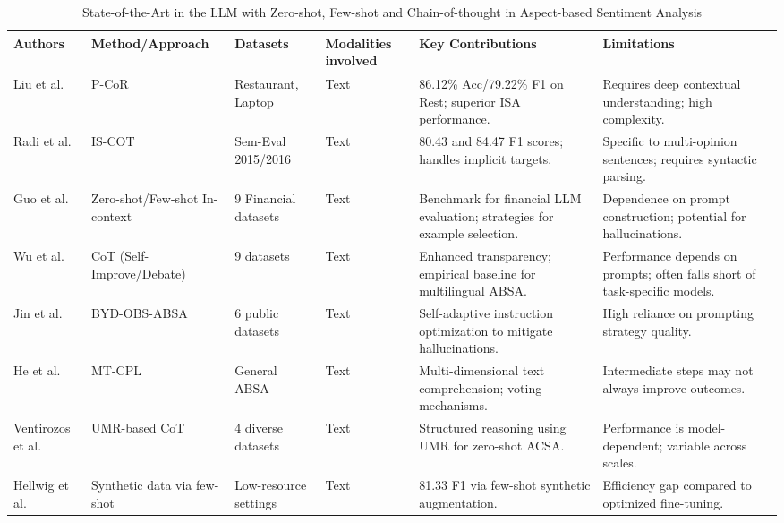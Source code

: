 \documentclass[english, online, cse, master]{dithesis}
\begin{document}
\begin{landscape}
\begin{table}[p]
\centering
\caption{State-of-the-Art in the LLM with Zero-shot, Few-shot and Chain-of-thought in Aspect-based Sentiment Analysis}
\label{tab:llm-zero-few-cot-absa}
\small
\renewcommand{\arraystretch}{1.2}
\begin{tabularx}{\linewidth}{|p{1.8cm}|p{3cm}|p{3cm}|p{1.8cm}|X|X|}
\hline
Authors & Method/Approach & Datasets & Modalities involved & Key Contributions & Limitations \\ \hline
Liu et al.  \parencite{chang_liu_7bb298f7} & P-CoR & Restaurant, Laptop & Text & 86.12\% Acc/79.22\% F1 on Rest; superior ISA performance. & Requires deep contextual understanding; high complexity. \\ \hline
Radi et al.  \parencite{mohammad_radi_96ee5847} & IS-COT & Sem-Eval 2015/2016 & Text & 80.43 and 84.47 F1 scores; handles implicit targets. & Specific to multi-opinion sentences; requires syntactic parsing. \\ \hline
Guo et al.  \parencite{yue_guo_642efc19} & Zero-shot/Few-shot In-context & 9 Financial datasets & Text & Benchmark for financial LLM evaluation; strategies for example selection. & Dependence on prompt construction; potential for hallucinations. \\ \hline
Wu et al.  \parencite{chengyan_wu_4c659eab} & CoT (Self-Improve/Debate) & 9 datasets & Text & Enhanced transparency; empirical baseline for multilingual ABSA. & Performance depends on prompts; often falls short of task-specific models. \\ \hline
Jin et al.  \parencite{weiqiang_jin_5ccfa531} & BYD-OBS-ABSA & 6 public datasets & Text & Self-adaptive instruction optimization to mitigate hallucinations. & High reliance on prompting strategy quality. \\ \hline
He et al.  \parencite{yating_he_0bd5c04f} & MT-CPL & General ABSA & Text & Multi-dimensional text comprehension; voting mechanisms. & Intermediate steps may not always improve outcomes. \\ \hline
Ventirozos et al.  \parencite{filippos_ventirozos_5976f1ad} & UMR-based CoT & 4 diverse datasets & Text & Structured reasoning using UMR for zero-shot ACSA. & Performance is model-dependent; variable across scales. \\ \hline
Hellwig et al.  \parencite{nils_constantin_hellwig_6fa4e097} & Synthetic data via few-shot & Low-resource settings & Text & 81.33 F1 via few-shot synthetic augmentation. & Efficiency gap compared to optimized fine-tuning. \\ \hline

\end{tabularx}
\end{table}
\end{landscape}
\end{document}
